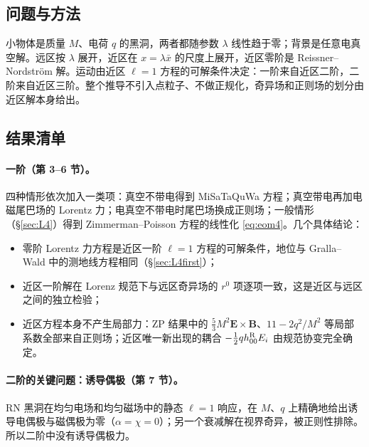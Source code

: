 \documentclass[11pt,a4paper]{ctexart}
\numberwithin{equation}{section}
\begin{document}
\subsection{问题与方法}

小物体是质量 $M$、电荷 $q$ 的黑洞，两者都随参数 $\lambda$ 线性趋于零；背景是任意电真空解。远区按 $\lambda$ 展开，近区在 $x=\lambda\bar x$ 的尺度上展开，近区零阶是 Reissner--Nordstr\"om 解。运动由近区 $\ell=1$ 方程的可解条件决定：一阶来自近区二阶，二阶来自近区三阶。整个推导不引入点粒子、不做正规化，奇异场和正则场的划分由近区解本身给出。

\subsection{结果清单}

\paragraph{一阶（第 3--6 节）。}四种情形依次加入一类项：真空不带电得到 MiSaTaQuWa 方程；真空带电再加电磁尾巴场的 Lorentz 力；电真空不带电时尾巴场换成正则场；一般情形（\S\ref{sec:L4}）得到 Zimmerman--Poisson 方程的线性化 \eqref{eq:eom4}。几个具体结论：
\begin{itemize}
\item 零阶 Lorentz 力方程是近区一阶 $\ell=1$ 方程的可解条件，地位与 Gralla--Wald 中的测地线方程相同（\S\ref{sec:L4first}）；
\item 近区一阶解在 Lorenz 规范下与远区奇异场的 $r^0$ 项逐项一致，这是近区与远区之间的独立检验；
\item 近区方程本身不产生局部力：ZP 结果中的 $\tfrac53M^2\boldsymbol E\times\boldsymbol B$、$11-2q^2/M^2$ 等局部系数全部来自正则场；近区唯一新出现的耦合 $-\tfrac12qh^{\rm R}_{00}E_i$ 由规范协变完全确定。
\end{itemize}

\paragraph{二阶的关键问题：诱导偶极（第 7 节）。}RN 黑洞在均匀电场和均匀磁场中的静态 $\ell=1$ 响应，在 $M$、$q$ 上精确地给出诱导电偶极与磁偶极为零（$\alpha=\chi=0$）；另一个衰减解在视界奇异，被正则性排除。所以二阶中没有诱导偶极力。
\end{document}
